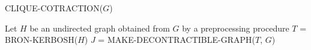\begin{algorithm}[H]
    \caption{CLIQUE-COTRACTION($G$)}\label{alg:clique-contraction}
    \begin{algorithmic}[1]
        \State Let $H$ be an undirected graph obtained from $G$ by a preprocessing procedure
        \State $T$ = BRON-KERBOSH($H$)
        \State $J$ = MAKE-DECONTRACTIBLE-GRAPH($T$, $G$)
    \end{algorithmic}
\end{algorithm}